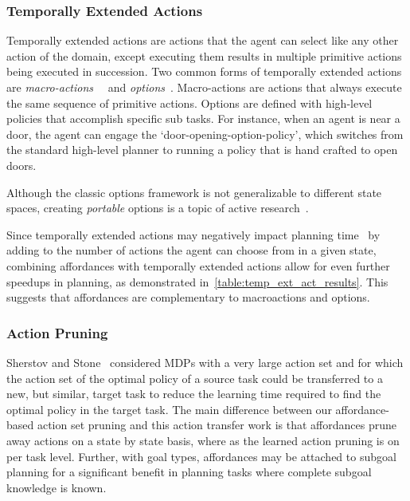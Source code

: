 \documentclass[letterpaper]{article}
\begin{document}
\subsubsection{Temporally Extended Actions}
Temporally extended actions are actions that the agent can
select like any other action of the domain, except executing them
results in multiple primitive actions being executed in
succession. Two common forms of temporally extended actions are {\em
  macro-actions}~\cite{hauskrecht98} ~and {\em options}~\cite{sutton99}. 
Macro-actions are actions that always
execute the same sequence of primitive actions. Options are defined
with high-level policies that accomplish specific sub tasks. For
instance, when an agent is near a door, the agent can engage the
`door-opening-option-policy', which switches from the standard
high-level planner to running a policy that is hand crafted to open
doors. 

Although the classic options framework is not generalizable to different state spaces,
creating {\em portable} options is a topic of active research~\cite{konidaris07,konidaris2009efficient,Ravindran03analgebraic,croonenborghs2008learning,andre2002state,konidaris2012transfer}.

Since temporally extended actions may negatively impact planning time~\cite{Jong:2008zr} by adding to the number of actions the agent can choose from in a given state, combining affordances with temporally extended actions allow for even further speedups in planning, as demonstrated in~\ref{table:temp_ext_act_results}. This suggests that affordances are complementary to macroactions and options.

\subsubsection{Action Pruning}

Sherstov and Stone~\cite{sherstov2005improving} considered MDPs with a very large 
action set and for which the action set of the optimal policy of a source task could be 
transferred to a new, but similar, target task to reduce the learning time required to find
the optimal policy in the target task. The main difference between our affordance-based 
action set pruning and this action transfer work is that affordances prune away actions on 
a state by state basis, where as the learned action pruning is on per task level. Further, 
with goal types, affordances may be attached to subgoal planning for a significant
benefit in planning tasks where complete subgoal knowledge is known.
\end{document}
